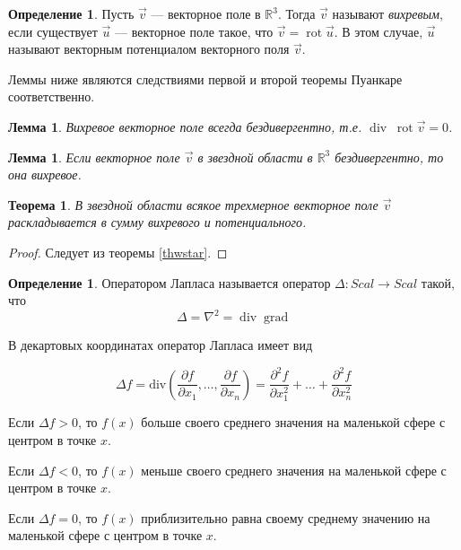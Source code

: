 \documentclass[a5paper]{article}
\newcounter{through}
\theoremstyle{plain}
\newtheorem{theorem}[through]{Теорема}
\newtheorem{lemma}[through]{Лемма}
\theoremstyle{definition}
\newtheorem{definition}[through]{Определение}
\numberwithin{through}{section}
\numberwithin{equation}{section}
\DeclareMathOperator{\rot}{rot}
\DeclareMathOperator{\grad}{grad}
\DeclareMathOperator{\diver}{div}
\begin{document}
\begin{definition}
	Пусть $\vec{v}$ --- векторное поле в $\mathbb{R}^3$. Тогда $\vec{v}$ называют \textit{вихревым}, если существует $\vec{u}$ --- векторное поле такое, что $\vec{v} = \rot \vec{u}$. В этом случае, $\vec{u}$ называют векторным потенциалом векторного поля $\vec{v}$.
\end{definition}

Леммы ниже являются следствиями первой и второй теоремы Пуанкаре соответственно.

\begin{lemma}
	Вихревое векторное поле всегда бездивергентно, т.е. $\diver \; \rot \vec{v} = 0$.
\end{lemma}

\begin{lemma}
	Если векторное поле $\vec{v}$ в звездной области в $\mathbb{R}^3$ бездивергентно, то она вихревое.
\end{lemma}

\begin{theorem}
	В звездной области всякое трехмерное векторное поле $\vec{v}$ раскладывается в сумму вихревого и потенциального.
\end{theorem}

\begin{proof}
	Следует из теоремы \ref{thwstar}.
\end{proof}

\begin{definition}
	Оператором Лапласа называется оператор $\Delta : Scal \to Scal$ такой, что 
	\begin{equation*}
		\Delta = \nabla^2 = \diver \grad
	\end{equation*}
\end{definition}

В декартовых координатах оператор Лапласа имеет вид

\begin{equation*}
\Delta f = \mathrm{div} \left(\frac{\partial f}{\partial x_1}, \ldots, \frac{\partial f}{\partial x_n}\right) = \frac{\partial^2 f}{\partial x_1^2} + \ldots + \frac{\partial^2 f}{\partial x_n^2}
\end{equation*}

Если $\Delta f > 0$, то $f(x)$ больше своего среднего значения на маленькой сфере с центром в точке $x$.

Если $\Delta f < 0$, то $f(x)$ меньше своего среднего значения на маленькой сфере с центром в точке $x$.

Если $\Delta f = 0$, то $f(x)$ приблизительно равна своему среднему значению на маленькой сфере с центром в точке $x$.
\end{document}
